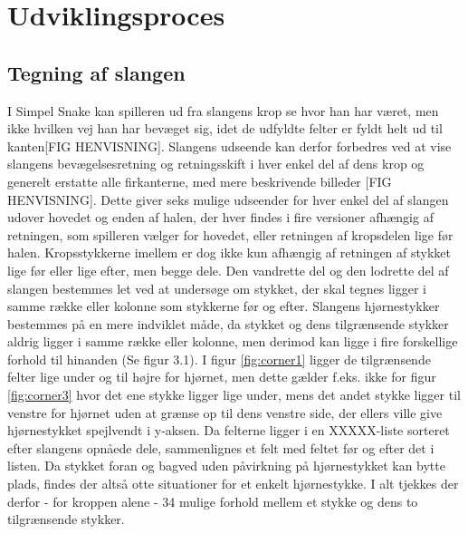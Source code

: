 \documentclass{report}
\begin{document}
\section{Udviklingsproces}

\subsection{Tegning af slangen}
I Simpel Snake kan spilleren ud fra slangens krop se hvor han har været, men ikke hvilken vej han har bevæget sig, idet de udfyldte felter er fyldt helt ud til kanten[FIG HENVISNING]. Slangens udseende kan derfor forbedres ved at vise slangens bevægelsesretning og retningsskift i hver enkel del af dens krop og generelt erstatte alle firkanterne, med mere beskrivende billeder [FIG HENVISNING]. Dette giver seks mulige udseender for hver enkel del af slangen udover hovedet og enden af halen, der hver findes i fire versioner afhængig af retningen, som spilleren vælger for hovedet, eller retningen af kropsdelen lige før halen. Kropsstykkerne imellem er dog ikke kun afhængig af retningen af stykket lige før eller lige efter, men begge dele. Den vandrette del og den lodrette del af slangen bestemmes let ved at undersøge om stykket, der skal tegnes ligger i samme række eller kolonne som stykkerne før og efter. Slangens hjørnestykker bestemmes på en mere indviklet måde, da stykket og dens tilgrænsende stykker aldrig ligger i samme række eller kolonne, men derimod kan ligge i fire forskellige forhold til hinanden (Se figur 3.1). I figur \ref{fig:corner1} ligger de tilgrænsende felter lige under og til højre for hjørnet, men dette gælder f.eks. ikke for figur \ref{fig:corner3} hvor det ene stykke ligger lige under, mens det andet stykke ligger til venstre for hjørnet uden at grænse op til dens venstre side, der ellers ville give hjørnestykket spejlvendt i y-aksen. Da felterne ligger i en XXXXX-liste sorteret efter slangens opnåede dele, sammenlignes et felt med feltet før og efter det i listen. Da stykket foran og bagved uden påvirkning på hjørnestykket kan bytte plads, findes der altså otte situationer for et enkelt hjørnestykke. I alt tjekkes der derfor - for kroppen alene - 34 mulige forhold mellem et stykke og dens to tilgrænsende stykker.
\linebreak
\end{document}
